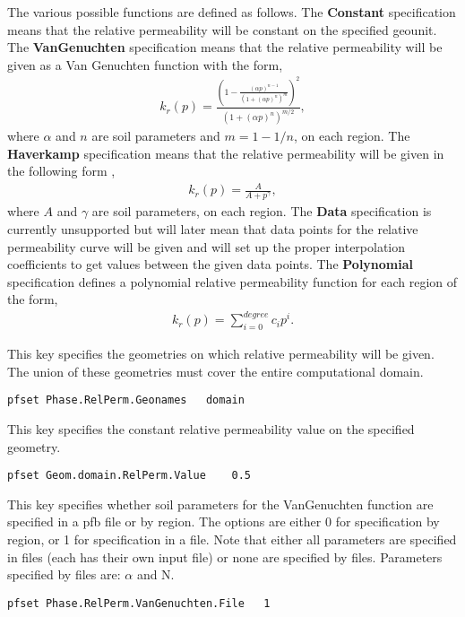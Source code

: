 The various possible functions are defined as follows.
The {\bf Constant} specification means that the relative permeability will be
constant on the specified geounit.  The {\bf VanGenuchten} specification means
that the relative permeability will be given as a Van Genuchten function
\cite{VanGenuchten80} with the form,
\begin{eqnarray}
k_r(p) = \frac{(1 - \frac{(\alpha p)^{n-1}}{(1 + (\alpha p)^n)^m})^2}
{(1 + (\alpha p)^n)^{m/2}},
\end{eqnarray}
where $\alpha$ and $n$ are soil parameters and $m = 1 - 1/n$, on each region.
The {\bf Haverkamp} specification means that the relative permeability will be
given in the following form \cite{Haverkamp-Vauclin81},
\begin{eqnarray}
k_r(p) = \frac{A}{A + p^{\gamma}},
\end{eqnarray}
where $A$ and $\gamma$ are soil parameters, on each region.
The {\bf Data} specification is currently unsupported but will later mean that
data points for the relative permeability curve will be given and \parflow{}
will set up the proper interpolation coefficients to get values between the
given data points.
The {\bf Polynomial} specification
defines a polynomial relative permeability function for each 
region of the form,
\begin{eqnarray}
k_r(p) = \sum_{i=0}^{degree} c_ip^i.
\end{eqnarray}

{This key specifies the geometries on which relative permeability will be
given.  The union of these geometries must cover the entire computational
domain.}
\begin{display}\begin{verbatim}
pfset Phase.RelPerm.Geonames   domain
\end{verbatim}\end{display}

{This key specifies the constant relative permeability value on the specified
geometry. }
\begin{display}\begin{verbatim}
pfset Geom.domain.RelPerm.Value    0.5
\end{verbatim}\end{display}

{This key specifies whether soil parameters for the VanGenuchten function are
specified in a pfb file or by region.  The options are either 0 for
specification by region, or 1 for specification in a file.  Note that either
all parameters are specified in files (each has their own input file) or none
are specified by files.  Parameters specified by files are: $\alpha$ and N.}
\begin{display}\begin{verbatim}
pfset Phase.RelPerm.VanGenuchten.File   1
\end{verbatim}\end{display}

